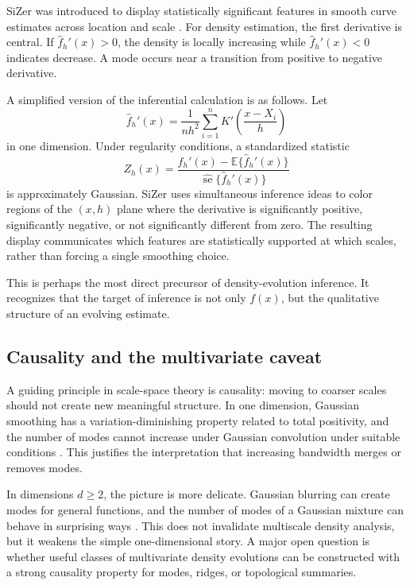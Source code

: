 \documentclass[preprint]{imsart}
\theoremstyle{plain}
\theoremstyle{definition}
\newcommand{\E}{\mathbb{E}}
\newcommand{\fhat}{\widehat f}
\begin{document}
SiZer was introduced to display statistically significant features in smooth curve estimates across location and scale \citep{chaudhuri_1999_SiZerExplorationStructures, chaudhuri_2000_ScaleSpaceView}. For density estimation, the first derivative is central. If $\fhat_h'(x)>0$, the density is locally increasing while $\fhat_h'(x)<0$ indicates decrease. A mode occurs near a transition from positive to negative derivative.

A simplified version of the inferential calculation is as follows. Let
\[
  \fhat_h'(x)=\frac{1}{nh^2}\sum_{i=1}^n K'\left(\frac{x-X_i}{h}\right)
\]
in one dimension. Under regularity conditions, a standardized statistic
\[
  Z_h(x)=\frac{\fhat_h'(x)-\E\{\fhat_h'(x)\}}{\widehat{\operatorname{se}}\{\fhat_h'(x)\}}
\]
is approximately Gaussian. SiZer uses simultaneous inference ideas to color regions of the $(x,h)$ plane where the derivative is significantly positive, significantly negative, or not significantly different from zero. The resulting display communicates which features are statistically supported at which scales, rather than forcing a single smoothing choice.

This is perhaps the most direct precursor of density-evolution inference. It recognizes that the target of inference is not only $f(x)$, but the qualitative structure of an evolving estimate.

\subsection{Causality and the multivariate caveat}
\label{subsec:causality}

A guiding principle in scale-space theory is causality: moving to coarser
scales should not create new meaningful structure. In one dimension, Gaussian smoothing has a variation-diminishing property related to total positivity, and the number of modes cannot increase under Gaussian convolution under suitable conditions \citep{schoenberg_1951_PolyaFrequencyFunctions, silverman_1981_UsingKernelDensity}. This justifies the interpretation that increasing bandwidth merges or removes modes.

In dimensions $d\ge2$, the picture is more delicate. Gaussian blurring can create modes for general functions, and the number of modes of a Gaussian mixture can behave in surprising ways \citep{carreira-perpinan_2003_NumberModesGaussian}. This does not invalidate multiscale density analysis, but it weakens the simple one-dimensional story. A major open question is whether useful classes of multivariate density evolutions can be constructed with a strong causality property for modes, ridges, or topological summaries.
\end{document}

